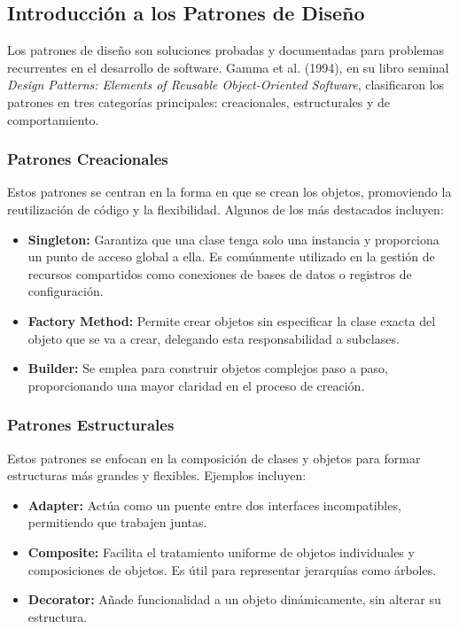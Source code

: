\documentclass[12pt, a4paper]{article}
\begin{document}
\subsection{Introducción a los Patrones de Diseño}
Los patrones de diseño son soluciones probadas y documentadas para problemas recurrentes en el desarrollo de software. Gamma et al. (1994), en su libro seminal \textit{Design Patterns: Elements of Reusable Object-Oriented Software}, clasificaron los patrones en tres categorías principales: creacionales, estructurales y de comportamiento.

\subsubsection{Patrones Creacionales}
Estos patrones se centran en la forma en que se crean los objetos, promoviendo la reutilización de código y la flexibilidad. Algunos de los más destacados incluyen:
\begin{itemize}
    \item \textbf{Singleton:} Garantiza que una clase tenga solo una instancia y proporciona un punto de acceso global a ella. Es comúnmente utilizado en la gestión de recursos compartidos como conexiones de bases de datos o registros de configuración.
    \item \textbf{Factory Method:} Permite crear objetos sin especificar la clase exacta del objeto que se va a crear, delegando esta responsabilidad a subclases.
    \item \textbf{Builder:} Se emplea para construir objetos complejos paso a paso, proporcionando una mayor claridad en el proceso de creación.
\end{itemize}

\subsubsection{Patrones Estructurales}
Estos patrones se enfocan en la composición de clases y objetos para formar estructuras más grandes y flexibles. Ejemplos incluyen:
\begin{itemize}
    \item \textbf{Adapter:} Actúa como un puente entre dos interfaces incompatibles, permitiendo que trabajen juntas.
    \item \textbf{Composite:} Facilita el tratamiento uniforme de objetos individuales y composiciones de objetos. Es útil para representar jerarquías como árboles.
    \item \textbf{Decorator:} Añade funcionalidad a un objeto dinámicamente, sin alterar su estructura.
\end{itemize}
\end{document}
